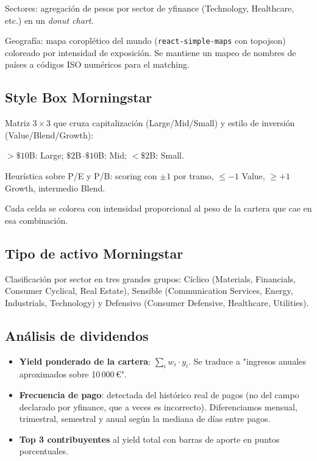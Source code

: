 \documentclass[11pt,a4paper]{article}
\begin{document}
Sectores: agregación de pesos por sector de yfinance (Technology, Healthcare, etc.) en un \textit{donut chart}.

Geografía: mapa coroplético del mundo (\texttt{react-simple-maps} con topojson) coloreado por intensidad de exposición. Se mantiene un mapeo de nombres de países a códigos ISO numéricos para el matching.

\subsection{Style Box Morningstar}

Matriz $3\times 3$ que cruza capitalización (Large/Mid/Small) y estilo de inversión (Value/Blend/Growth):

\begin{description}[leftmargin=1.4cm]
  \item[Capitalización] $> \$10$B: Large; $\$2$B--$\$10$B: Mid; $< \$2$B: Small.
  \item[Estilo] Heurística sobre P/E y P/B: scoring con $\pm 1$ por tramo, $\le -1$ Value, $\ge +1$ Growth, intermedio Blend.
\end{description}

Cada celda se colorea con intensidad proporcional al peso de la cartera que cae en esa combinación.

\subsection{Tipo de activo Morningstar}

Clasificación por sector en tres grandes grupos: Cíclico (Materials, Financials, Consumer Cyclical, Real Estate), Sensible (Communication Services, Energy, Industrials, Technology) y Defensivo (Consumer Defensive, Healthcare, Utilities).

\subsection{Análisis de dividendos}

\begin{itemize}
  \item \textbf{Yield ponderado de la cartera}: $\sum_i w_i \cdot y_i$. Se traduce a "ingresos anuales aproximados sobre 10\,000\,€".
  \item \textbf{Frecuencia de pago}: detectada del histórico real de pagos (no del campo declarado por yfinance, que a veces es incorrecto). Diferenciamos mensual, trimestral, semestral y anual según la mediana de días entre pagos.
  \item \textbf{Top 3 contribuyentes} al yield total con barras de aporte en puntos porcentuales.
\end{itemize}
\end{document}

